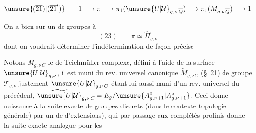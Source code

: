 

\[
\unsure{(\overline{21})|(\overline{21}')}\qquad
1\longrightarrow\pi\longrightarrow\pi_1(\unsure{U|\mathcal{U}}_{g,\nu\,\overline{Q}})
\longrightarrow\pi_1(M_{g,\nu\,\overline{Q}})\longrightarrow1
\]

On a bien sur un  de groupes à 
\[
(23)\qquad \pi\simeq\widehat{\Pi}_{g,\nu}
\]
dont on voudrait déterminer l'indétermination de façon précise

Notons $M_{g,\nu\,C}$ le   de Teichmüller complexe, défini à l'aide de la surface  $\unsure{U|\mathcal{U}}_{g,\nu}$, il est muni du rev. universel canonique $\widetilde{M}_{g,\nu\,C}$ (\S~21)
de groupe  $\mathcal{T}_{g,\nu}^{+}$ justement 
$\unsure{U|\mathcal{U}}_{g,\nu\,C}$ étant lui aussi muni d'un rev. universel  du précédent,
$\widetilde{\unsure{U|\mathcal{U}}}_{g,\nu\,C}=E_g/\unsure{A_{g,\nu+1}^{0}|A_{g,\nu+1}^{\circ}}$.
Ceci donne naissance à la suite exacte de groupes discrets (dans le contexte topologie générale)
par un  de  d'extensions), qui par passage aux complétés profinis donne la suite exacte analogue pour les



